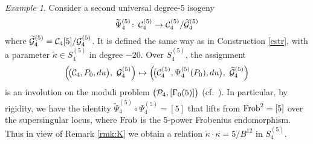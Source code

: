\documentclass{gtpart}
\theoremstyle{definition}
\theoremstyle{remark}
\newtheorem{ex}[thm]{Example}
\def\co{\colon\thinspace}
\newcommand{\CC}{{\cal C}}
\newcommand{\CG}{{\cal G}}
\newcommand{\CP}{{\cal P}}
\newcommand{\Frob}{{\rm Frob}}
\newcommand{\G}{\Gamma}
\newcommand{\K}{\kappa}
\renewcommand{\=}{\approx}
\renewcommand{\-}{\sim}
\numberwithin{equation}{section}
\numberwithin{thm}{section}
\begin{document}
\begin{ex}
 Consider a second universal degree-$5$ isogeny 
 \[
  \widetilde{\Psi}_4^{(5)} \co \CC_4^{(5)} \to \CC_4^{(5)} / \widetilde{\CG}_4^{(5)} 
 \]
 where $\widetilde{\CG}_4^{(5)} = \CC_4[5] / \CG_4^{(5)}$.  
 It is defined the same way as in Construction \ref{cstr}, 
 with a parameter $\widetilde{\K} \in S_4^{(5)}$ in degree $-20$.  
 Over $S_4^{(5)}$, the assignment 
 \[
  \left(\! \big( \CC_4, P_0, du \big), ~ \CG_4^{(5)} \right) \mapsto \left(\! \big( \CC_4^{(5)}, \Psi_4^{(5)}(P_0), du \big), ~ \widetilde{\CG}_4^{(5)} \right) 
 \]
 is an involution on the moduli problem $\big(\CP_4,[\G_0(5)]\big)$ (cf.~\cite[11.3.1]{KM}).  In particular, 
 by rigidity, we have the identity $\widetilde{\Psi}_4^{(5)} \circ \Psi_4^{(5)} = [5]$ that lifts from $\Frob^2 = [5]$ over the supersingular locus, 
 where $\Frob$ is the 5-power Frobenius endomorphism.  
 Thus in view of Remark \ref{rmk:K} we obtain a relation $\widetilde{\K} \cdot \K = 5 / B^{12}$ in $S_4^{(5)}$.  


\end{ex}
\end{document}
